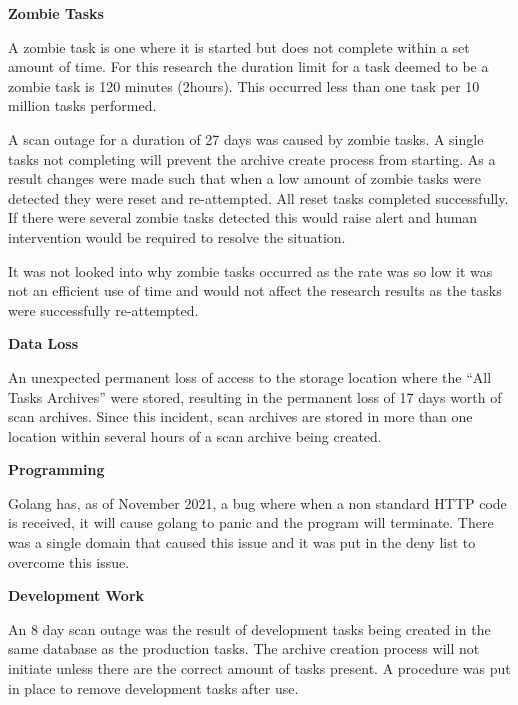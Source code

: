 \documentclass{mscreport}
\begin{document}
\textbf{Zombie Tasks}

\vspace{0.2cm} \noindent
A zombie task is one where it is started but does not complete within a set amount of time. For this research the duration limit for a task deemed to be a zombie task is 120 minutes (2hours). This occurred less than one task per 10 million tasks performed.

\vspace{0.2cm} \noindent
A scan outage for a duration of 27 days was caused by zombie tasks. A single tasks not completing will prevent the archive create process from starting. As a result changes were made such that when a low amount of zombie tasks were detected they were reset and re-attempted. All reset tasks completed successfully. If there were several zombie tasks detected this would raise alert and human intervention would be required to resolve the situation.

\vspace{0.2cm} \noindent
It was not looked into why zombie tasks occurred as the rate was so low it was not an efficient use of time and would not affect the research results as the tasks were successfully re-attempted.

\vspace{0.6cm} \noindent
\textbf{Data Loss}

\vspace{0.2cm} \noindent
An unexpected permanent loss of access to the storage location where the ``All Tasks Archives'' were stored, resulting in the permanent loss of 17 days worth of scan archives. Since this incident, scan archives are stored in more than one location within several hours of a scan archive being created.

\vspace{0.6cm} \noindent
\textbf{Programming}

\vspace{0.2cm} \noindent
Golang has, as of November 2021, a bug \cite{noauthor_undated-kp} where when a non standard HTTP code is received, it will cause golang to panic and the program will terminate. There was a single domain that caused this issue and it was put in the deny list to overcome this issue.

\vspace{0.6cm} \noindent
\textbf{Development Work}

\vspace{0.2cm} \noindent
An 8 day scan outage was the result of development tasks being created in the same database as the production tasks. The archive creation process will not initiate unless there are the correct amount of tasks present. A procedure was put in place to remove development tasks after use.
\end{document}
